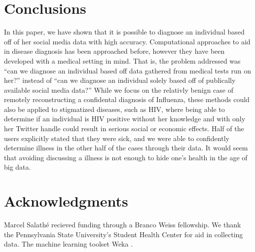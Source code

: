 \documentclass{acm_proc_article-sp}
\begin{document}
\section{Conclusions}


In this paper, we have shown that it is possible to diagnose an individual based off of her social media data with high accuracy. Computational approaches to aid in disease diagnosis has been approached before, however they have been developed with a medical setting in mind. That is, the problem addressed was ``can we diagnose an individual based off data gathered from medical tests run on her?'' instead of ``can we diagnose an individual solely based off of publically available social media data?''  While we focus on the relativly benign case of remotely reconstructing a confidental diagnosis of Influenza, these methods could also be applied to stigmatized diseases, such as HIV, where being able to determine if an individual is HIV positive without her knowledge and with only her Twitter handle could result in serious social or economic effects. Half of the users explicitly stated that they were sick, and we were able to confidently determine illness in the other half of the cases through their data. It would seem that avoiding discussing a illness is not enough to hide one's health in the age of big data. 


\section{Acknowledgments}

Marcel Salath\'e recieved funding through a Branco Weiss fellowship. We thank the Pennsylvania State University's Student Health Center for aid in collecting data. The machine learning toolset Weka \cite{Hall:2009ud}.




\end{document}
